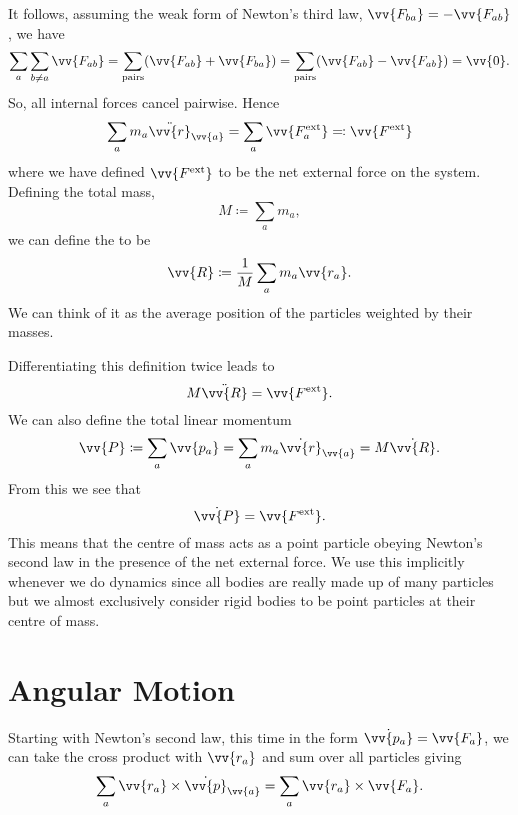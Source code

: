 \documentclass[fleqn]{NotesClass}
\newcommand*{\ext}{\mathrm{ext}}
\begin{document}
    It follows, assuming the weak form of Newton's third law, \(\vv{F_{ba}} = -\vv{F_{ab}}\), we have
    \begin{equation}
        \sum_{a}\sum_{b\ne a} \vv{F_{ab}} = \sum_{\text{pairs}}(\vv{F_{ab}} + \vv{F_{ba}}) = \sum_{\text{pairs}} (\vv{F_{ab}} - \vv{F_{ab}}) = \vv{0}.
    \end{equation}
    So, all internal forces cancel pairwise.
    Hence
    \begin{equation}
        \sum_a m_a\ddot{\vv{r}}_{\vv{a}} = \sum_a \vv{F_{a}^{\ext}} \eqqcolon \vv{F^{\ext}}
    \end{equation}
    where we have defined \(\vv{F^{\ext}}\) to be the net external force on the system.
    Defining the total mass,
    \begin{equation}
        M \coloneqq \sum_a m_a,
    \end{equation}
    we can define the  to be
    \begin{equation}
        \vv{R} \coloneqq \frac{1}{M}\sum_a m_a\vv{r_a}.
    \end{equation}
    We can think of it as the average position of the particles weighted by their masses.
    
    Differentiating this definition twice leads to
    \begin{equation}
        M\ddot{\vv{R}} = \vv{F^{\ext}}.
    \end{equation}
    We can also define the total linear momentum
    \begin{equation}
        \vv{P} \coloneqq \sum_a \vv{p_a} = \sum_a m_a \dot{\vv{r}}_{\vv{a}} = M\dot{\vv{R}}.
    \end{equation}
    From this we see that
    \begin{equation}
        \dot{\vv{P}} = \vv{F^{\ext}}.
    \end{equation}
    This means that the centre of mass acts as a point particle obeying Newton's second law in the presence of the net external force.
    We use this implicitly whenever we do dynamics since all bodies are really made up of many particles but we almost exclusively consider rigid bodies to be point particles at their centre of mass.
    
    \section{Angular Motion}
    Starting with Newton's second law, this time in the form \(\dot{\vv{p_a}} = \vv{F_a}\), we can take the cross product with \(\vv{r_a}\) and sum over all particles giving
    \begin{equation}\label{eqn:angular motion system of particles}
        \sum_a \vv{r_a}\times\dot{\vv{p}}_{\vv{a}} = \sum_a \vv{r_a}\times\vv{F_a}.
    \end{equation}
\end{document}
